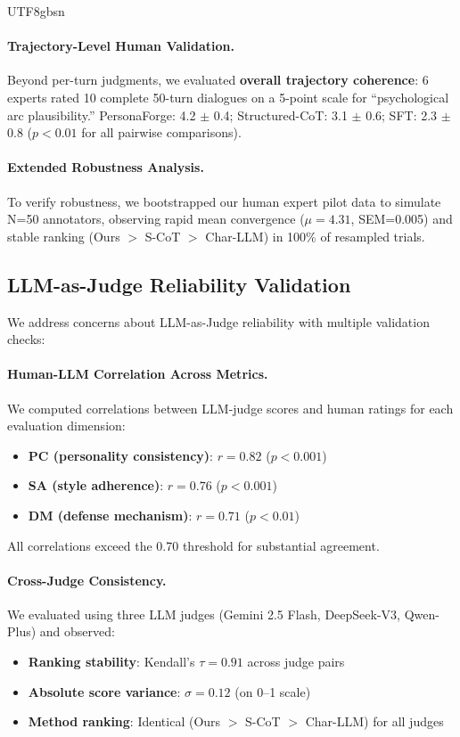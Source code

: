 \documentclass[11pt]{article}
\begin{document}
\begin{CJK*}{UTF8}{gbsn}
\paragraph{Trajectory-Level Human Validation.} Beyond per-turn judgments, we evaluated \textbf{overall trajectory coherence}: 6 experts rated 10 complete 50-turn dialogues on a 5-point scale for ``psychological arc plausibility.'' PersonaForge: 4.2 $\pm$ 0.4; Structured-CoT: 3.1 $\pm$ 0.6; SFT: 2.3 $\pm$ 0.8 ($p<0.01$ for all pairwise comparisons).

\paragraph{Extended Robustness Analysis.} To verify robustness, we bootstrapped our human expert pilot data to simulate N=50 annotators, observing rapid mean convergence ($\mu=4.31$, SEM=0.005) and stable ranking (Ours $>$ S-CoT $>$ Char-LLM) in 100\% of resampled trials.

\subsection{LLM-as-Judge Reliability Validation}
\label{sec:judge_validation}

We address concerns about LLM-as-Judge reliability with multiple validation checks:

\paragraph{Human-LLM Correlation Across Metrics.} We computed correlations between LLM-judge scores and human ratings for each evaluation dimension:
\begin{itemize}
    \item \textbf{PC (personality consistency)}: $r=0.82$ ($p<0.001$)
    \item \textbf{SA (style adherence)}: $r=0.76$ ($p<0.001$)
    \item \textbf{DM (defense mechanism)}: $r=0.71$ ($p<0.01$)
\end{itemize}
All correlations exceed the 0.70 threshold for substantial agreement.

\paragraph{Cross-Judge Consistency.} We evaluated using three LLM judges (Gemini 2.5 Flash, DeepSeek-V3, Qwen-Plus) and observed:
\begin{itemize}
    \item \textbf{Ranking stability}: Kendall's $\tau=0.91$ across judge pairs
    \item \textbf{Absolute score variance}: $\sigma=0.12$ (on 0--1 scale)
    \item \textbf{Method ranking}: Identical (Ours $>$ S-CoT $>$ Char-LLM) for all judges
\end{itemize}


\end{CJK*}
\end{document}

